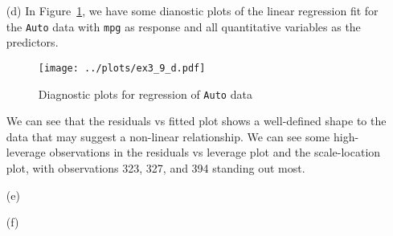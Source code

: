 \begin{itemize}
\begin{verbatim}
Residual standard error: 3.328 on 384 degrees of freedom
Multiple R-squared:  0.8215,    Adjusted R-squared:  0.8182 
F-statistic: 252.4 on 7 and 384 DF,  p-value: < 2.2e-16
        \end{verbatim}\normalsize
        \begin{itemize}
            \item[(i)] Yes, since we have several predictors with low $p$-values
                and/or low standard error relative to the estimate.
            \item[(ii)] The predictors with the most statistically significant
                relationship to the response appear to be \verb|displacement|, 
                \verb|weight|, \verb|year|, and \verb|origin|.
            \item[(iii)] The coefficient of the \verb|year| variable is given
                by 0.750773, suggesting that an increase of 1 year in the model's 
                date of manufacture is associated with an increase of 0.750773 miles
                per gallon in fuel consumption by the vehicle.
        \end{itemize}
    \item[(d)] In Figure~\ref{fig3_9diag}, we have some dianostic plots of the linear 
        regression fit for the \verb|Auto| data with \verb|mpg| as response and all 
        quantitative variables as the predictors.
        \begin{figure}[!ht]
            \texttt{[image: ../plots/ex3\_9\_d.pdf]}
            \caption{Diagnostic plots for regression of \texttt{Auto} data \label{fig3_9diag}}
        \end{figure}
        We can see that the residuals vs fitted plot shows a well-defined shape to the
        data that may suggest a non-linear relationship. We can see some high-leverage
        observations in the residuals vs leverage plot and the scale-location plot, 
        with observations 323, 327, and 394 standing out most.
    \item[(e)]
    \item[(f)]
\end{itemize}
